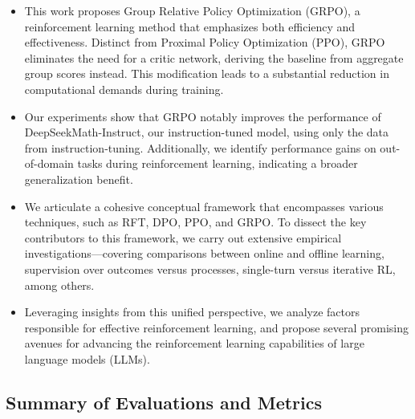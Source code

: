 \begin{itemize}[topsep=0pt]
    \item This work proposes Group Relative Policy Optimization (GRPO), a reinforcement learning method that emphasizes both efficiency and effectiveness. Distinct from Proximal Policy Optimization (PPO), GRPO eliminates the need for a critic network, deriving the baseline from aggregate group scores instead. This modification leads to a substantial reduction in computational demands during training.
    \item Our experiments show that GRPO notably improves the performance of DeepSeekMath-Instruct, our instruction-tuned model, using only the data from instruction-tuning. Additionally, we identify performance gains on out-of-domain tasks during reinforcement learning, indicating a broader generalization benefit.
    \item We articulate a cohesive conceptual framework that encompasses various techniques, such as RFT, DPO, PPO, and GRPO. To dissect the key contributors to this framework, we carry out extensive empirical investigations—covering comparisons between online and offline learning, supervision over outcomes versus processes, single-turn versus iterative RL, among others.
    \item Leveraging insights from this unified perspective, we analyze factors responsible for effective reinforcement learning, and propose several promising avenues for advancing the reinforcement learning capabilities of large language models (LLMs).
\end{itemize}

\subsection{Summary of Evaluations and Metrics}


